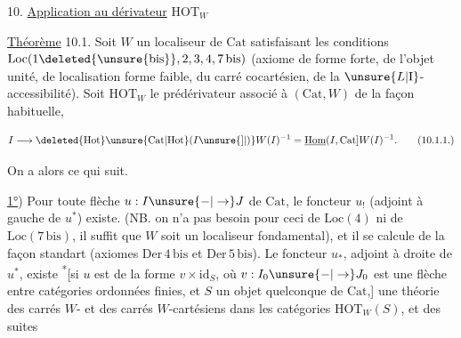 
10. \uline{Application au dérivateur} $\mathrm{HOT}_{W}$

\uline{Théorème} 10.1. Soit $W$ un localiseur de $\mathrm{Cat}$ satisfaisant les conditions $\mathrm{Loc}(1\deleted{\unsure{\mathrm{bis}}},2,3,4,7\,\mathrm{bis})$
(axiome de  forme forte, de l'objet unité,
de localisation forme faible, du carré cocartésien, de la
 $\unsure{L|\mathrm I}$-accessibilité). 
Soit $\mathrm{HOT}_{W}$ le prédérivateur  associé à $(\mathrm{Cat},W)$
de la façon habituelle,

\[
 I\longrightarrow \deleted{\mathrm{Hot}}\unsure{\mathrm{Cat}|\mathrm{Hot}}(I\unsure{]|)}W(I)^{-1}
 =\underline{\mathrm{Hom}}(I,\mathrm{Cat}]W(I)^{-1}.
 \tag*{(10.1.1.)}
\]

On a alors ce qui suit.

\uline{1°})  Pour toute flèche
$u:I\unsure{-|\to}J$ de $\mathrm{Cat}$, le foncteur $u_!$ (adjoint
à gauche de $u^*$) existe. (NB. on n'a pas
besoin pour ceci de $\mathrm{Loc}(4)$ ni de $\mathrm{Loc}(7\,\mathrm{bis})$,
il suffit que $W$ soit un localiseur fondamental),
et il se calcule de la façon standart
(axiomes $\mathrm{Der}\,4\,\mathrm{bis}$ et $\mathrm{Der}\,5\,\mathrm{bis}$). Le foncteur
$u_*$, adjoint à droite de $u^*$, existe \textsuperscript{*}[si
$u$ est  de la forme $v\times\mathrm{id}_{S}$, où
$v:I_0\unsure{-|\to}J_0$ est une flèche entre catégories
ordonnées finies, et $S$ un objet quelconque
de $\mathrm{Cat}$,] 
 une théorie des
carrés $W$- et des carrés $W$-cartésiens
dans les catégories $\mathrm{HOT}_{W}(S)$, et des suites
